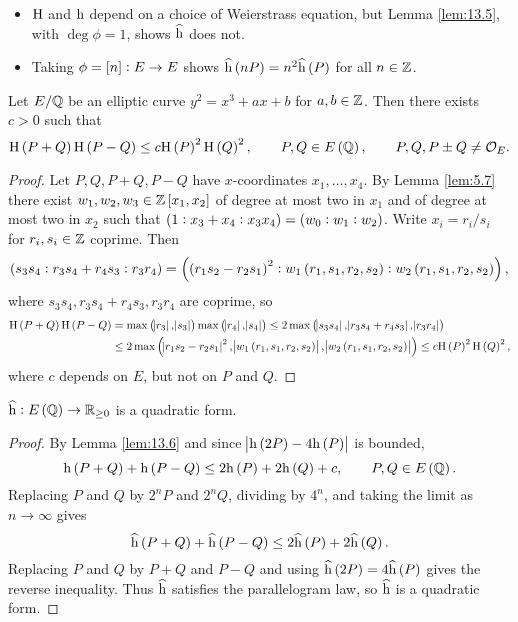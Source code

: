 
\begin{remark*}
\hfill
\begin{itemize}
\item $ \mathrm{H} $ and $ \mathrm{h} $ depend on a choice of Weierstrass equation, but Lemma \ref{lem:13.5}, with $ \deg \phi = 1 $, shows $ \widehat{\mathrm{h}} $ does not.
\item Taking $ \phi = \sbr{n} : E \to E $ shows $ \widehat{\h}\br{nP} = n^2\widehat{\h}\br{P} $ for all $ n \in \mathbb{Z} $.
\end{itemize}
\end{remark*}

\begin{lemma}
\label{lem:13.6}
Let $ E / \mathbb{Q} $ be an elliptic curve $ y^2 = x^3 + ax + b $ for $ a, b \in \mathbb{Z} $. Then there exists $ c > 0 $ such that
$$ \H\br{P + Q}\H\br{P - Q} \le c\H\br{P}^2\H\br{Q}^2, \qquad P, Q \in E\br{\QQ}, \qquad P, Q, P \pm Q \ne \OOO_E. $$
\end{lemma}

\begin{proof}
Let $ P, Q, P + Q, P - Q $ have $ x $-coordinates $ x_1, \dots, x_4 $. By Lemma \ref{lem:5.7} there exist $ w_1, w_2, w_3 \in \ZZ\sbr{x_1, x_2} $ of degree at most two in $ x_1 $ and of degree at most two in $ x_2 $ such that $ \br{1 : x_3 + x_4 : x_3x_4} = \br{w_0 : w_1 : w_2} $. Write $ x_i = r_i / s_i $ for $ r_i, s_i \in \mathbb{Z} $ coprime. Then
$$ \br{s_3s_4 : r_3s_4 + r_4s_3 : r_3r_4} = \br{\br{r_1s_2 - r_2s_1}^2 : w_1\br{r_1, s_1, r_2, s_2} : w_2\br{r_1, s_1, r_2, s_2}}, $$
where $ s_3s_4, r_3s_4 + r_4s_3, r_3r_4 $ are coprime, so
\begin{align*}
\H\br{P + Q}\H\br{P - Q}
& = \max\br{\abs{r_3}, \abs{s_3}}\max\br{\abs{r_4}, \abs{s_4}}
\le 2\max\br{\abs{s_3s_4}, \abs{r_3s_4 + r_4s_3}, \abs{r_3r_4}} \\
& \le 2\max\br{\abs{r_1s_2 - r_2s_1}^2, \abs{w_1\br{r_1, s_1, r_2, s_2}}, \abs{w_2\br{r_1, s_1, r_2, s_2}}}
\le c\H\br{P}^2\H\br{Q}^2,
\end{align*}
where $ c $ depends on $ E $, but not on $ P $ and $ Q $.
\end{proof}

\begin{theorem}
\label{thm:13.7}
$ \widehat{\h} : E\br{\QQ} \to \RR_{\ge 0} $ is a quadratic form.
\end{theorem}

\begin{proof}
By Lemma \ref{lem:13.6} and since $ \abs{\h\br{2P} - 4\h\br{P}} $ is bounded,
$$ \h\br{P + Q} + \h\br{P - Q} \le 2\h\br{P} + 2\h\br{Q} + c, \qquad P, Q \in E\br{\QQ}. $$
Replacing $ P $ and $ Q $ by $ 2^nP $ and $ 2^nQ $, dividing by $ 4^n $, and taking the limit as $ n \to \infty $ gives
$$ \widehat{\h}\br{P + Q} + \widehat{\h}\br{P - Q} \le 2\widehat{\h}\br{P} + 2\widehat{\h}\br{Q}. $$
Replacing $ P $ and $ Q $ by $ P + Q $ and $ P - Q $ and using $ \widehat{\h}\br{2P} = 4\widehat{\h}\br{P} $ gives the reverse inequality. Thus $ \widehat{\mathrm{h}} $ satisfies the parallelogram law, so $ \widehat{\mathrm{h}} $ is a quadratic form.
\end{proof}

